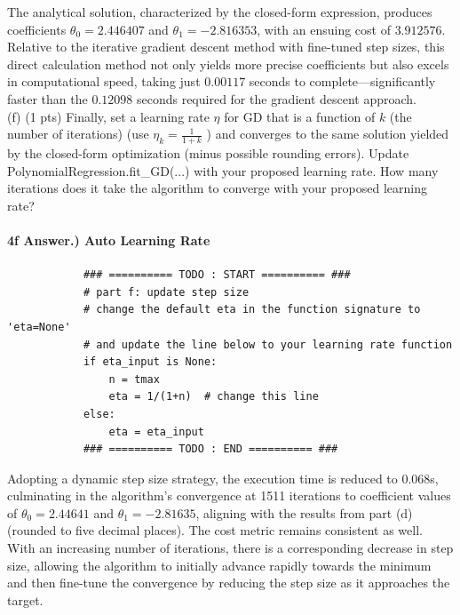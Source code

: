 \documentclass[10pt]{article}
\begin{document}
The analytical solution, characterized by the closed-form expression, produces coefficients \(\theta_0 = 2.446407\) and \(\theta_1 = -2.816353\), with an ensuing cost of \(3.912576\). Relative to the iterative gradient descent method with fine-tuned step sizes, this direct calculation method not only yields more precise coefficients but also excels in computational speed, taking just \(0.00117\) seconds to complete—significantly faster than the \(0.12098\) seconds required for the gradient descent approach.\\


(f) (1 pts) Finally, set a learning rate $\eta$ for GD that is a function of $k$ (the number of iterations) (use $\eta_{k}=\frac{1}{1+k}$ ) and converges to the same solution yielded by the closed-form optimization (minus possible rounding errors). Update PolynomialRegression.fit\_GD(...) with your proposed learning rate. How many iterations does it take the algorithm to converge with your proposed learning rate?

\paragraph{4f Answer.) Auto Learning Rate}
\hspace{1cm}

\begin{verbatim}
            ### ========== TODO : START ========== ###
            # part f: update step size
            # change the default eta in the function signature to 'eta=None'
            # and update the line below to your learning rate function
            if eta_input is None:
                n = tmax
                eta = 1/(1+n)  # change this line
            else:
                eta = eta_input
            ### ========== TODO : END ========== ###
\end{verbatim}

Adopting a dynamic step size strategy, the execution time is reduced to 0.068s, culminating in the algorithm's convergence at 1511 iterations to coefficient values of \(\theta_0 = 2.44641\) and \(\theta_1 = -2.81635\), aligning with the results from part (d) (rounded to five decimal places). The cost metric remains consistent as well. With an increasing number of iterations, there is a corresponding decrease in step size, allowing the algorithm to initially advance rapidly towards the minimum and then fine-tune the convergence by reducing the step size as it approaches the target.\\
\end{document}
